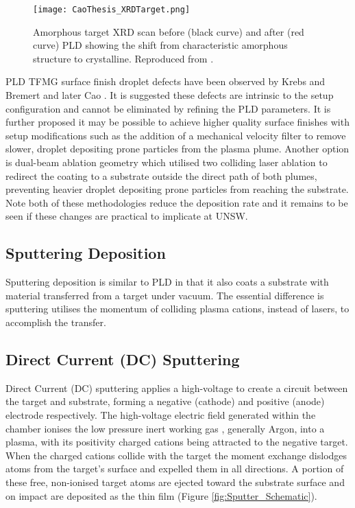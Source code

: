 \documentclass[draft,a4paper,12pt,oneside]{report}%
\begin{document}
\begin{figure}[htbp]
	\centering
	\texttt{[image: CaoThesis\_XRDTarget.png]}
	\caption[Target Re-Crystallisation]{Amorphous target XRD scan before (black curve) and after (red curve) PLD showing the shift from characteristic amorphous structure to crystalline. Reproduced from \cite{Cao2013}.}
	\label{fig:ReCryTarget}
\end{figure}

PLD TFMG surface finish droplet defects have been observed by Krebs and Bremert \cite{Krebs1993} and later Cao \cite{Cao2013}. It is suggested these defects are intrinsic to the setup configuration and cannot be eliminated by refining the PLD parameters. It is further proposed it may be possible to achieve higher quality surface finishes with setup modifications such as the addition of a mechanical velocity filter to remove slower, droplet depositing prone particles from the plasma plume. Another option is dual-beam ablation geometry which utilised two colliding laser ablation to redirect the coating to a substrate outside the direct path of both plumes, preventing heavier droplet depositing prone particles from reaching the substrate. Note both of these methodologies reduce the deposition rate and it remains to be seen if these changes are practical to implicate at UNSW.

\subsection{Sputtering Deposition}
Sputtering deposition is similar to PLD in that it also coats a substrate with material transferred from a target under vacuum. The essential difference is sputtering utilises the momentum of colliding plasma cations, instead of lasers, to accomplish the transfer. 

\subsection{Direct Current (DC) Sputtering} 
Direct Current (DC) sputtering applies a high-voltage to create a circuit between the target and substrate, forming a negative (cathode) and positive (anode) electrode respectively. The high-voltage electric field generated within the chamber ionises the low pressure inert working gas , generally Argon, into a plasma, with its positivity charged cations being attracted to the negative target. When the charged cations collide with the target the moment exchange dislodges atoms from the target's surface and expelled them in all directions. A portion of these free, non-ionised target atoms are ejected toward the substrate surface and on impact are deposited as the thin film (Figure \ref{fig:Sputter_Schematic}).
\end{document}
